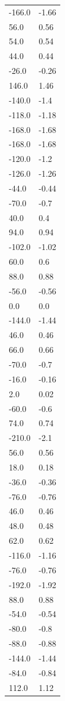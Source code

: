\begin{longtable}{ll}
-166.0 & -1.66 \\
56.0 & 0.56 \\
54.0 & 0.54 \\
44.0 & 0.44 \\
-26.0 & -0.26 \\
146.0 & 1.46 \\
-140.0 & -1.4 \\
-118.0 & -1.18 \\
-168.0 & -1.68 \\
-168.0 & -1.68 \\
-120.0 & -1.2 \\
-126.0 & -1.26 \\
-44.0 & -0.44 \\
-70.0 & -0.7 \\
40.0 & 0.4 \\
94.0 & 0.94 \\
-102.0 & -1.02 \\
60.0 & 0.6 \\
88.0 & 0.88 \\
-56.0 & -0.56 \\
0.0 & 0.0 \\
-144.0 & -1.44 \\
46.0 & 0.46 \\
66.0 & 0.66 \\
-70.0 & -0.7 \\
-16.0 & -0.16 \\
2.0 & 0.02 \\
-60.0 & -0.6 \\
74.0 & 0.74 \\
-210.0 & -2.1 \\
56.0 & 0.56 \\
18.0 & 0.18 \\
-36.0 & -0.36 \\
-76.0 & -0.76 \\
46.0 & 0.46 \\
48.0 & 0.48 \\
62.0 & 0.62 \\
-116.0 & -1.16 \\
-76.0 & -0.76 \\
-192.0 & -1.92 \\
88.0 & 0.88 \\
-54.0 & -0.54 \\
-80.0 & -0.8 \\
-88.0 & -0.88 \\
-144.0 & -1.44 \\
-84.0 & -0.84 \\
112.0 & 1.12 \\

\end{longtable}

